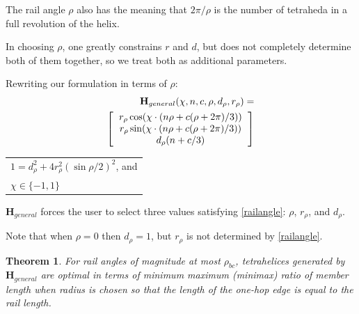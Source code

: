 \documentclass[twocolumn,10pt]{asme2ej}
\newtheorem{theorem}{Theorem}
\renewcommand{\vec}[1]{\mathbf{#1}}
\begin{document}
The rail angle $\rho$ also has the meaning that $2 \pi / \rho$ is the number of
tetraheda in a full revolution of the helix.

In choosing $\rho$, one greatly constrains $r$ and $d$, but does not completely
determine both of them together, so we treat both as additional parameters.

Rewriting our formulation in terms of $\rho$:
\begin{equation}
  \begin{split}
  \label{eq:general}  
\vec{H}_{general}(\chi,n,c,\rho,d_{\rho},r_{\rho}) = \\ 
 \left [
  \begin{tabular}{c}
   $ r_{\rho} \cos(\chi \cdot (n \rho + c(\rho +  2 \pi) /3)) $\\
   $ r_{\rho}  \sin(\chi \cdot (n \rho + c(\rho +  2 \pi) /3)) $\\
   $ d_{\rho} (n + c /3) $
  \end{tabular}
  \right ] \\
   \end{split}
\end{equation}  
\begin{tabular}{l}
  $   1 = d_{\rho}^2 + 4 r_{\rho}^2 (\sin{ \rho / 2})^2 $, and \\
    $\chi \in \{-1,1\}$ \text{.} \\  
\end{tabular}



$\vec{H}_{general}$ forces the user to select three values satisfying \cref{railangle}: $\rho$, $r_{\rho}$, and $d_{\rho}$.

Note that when $\rho = 0$ then $d_{\rho} = 1$, but $r_{\rho}$ is not determined by
\cref{railangle}.

\begin{theorem}
  \label{generalformulaoptimal}
  For rail angles of magnitude at most $\rho_{bc}$, tetrahelices generated by
  $\vec{H}_{general}$ are optimal in terms of minimum maximum (minimax) ratio of member
  length when radius is chosen so that
  the length of the one-hop edge is equal to the rail length.
\end{theorem}
\end{document}
